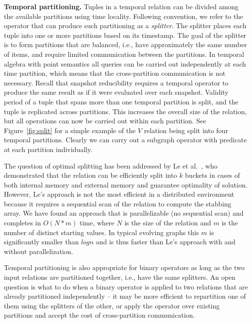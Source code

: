 {\bf Temporal partitioning.}  Tuples in a temporal relation can be
divided among the available partitions using time locality.  Following
convention, we refer to the operator that can produce such
partitioning as a {\em splitter}.  The splitter places each tuple into
one or more partitions based on its timestamp.  The goal of the
splitter is to form partitions that are balanced, i.e., have
approximately the same number of items, and require limited
communication between the partitions.  In temporal algebra with point
semantics all queries can be carried out independently at each time
partition, which means that the cross-partition communication is not
necessary.  Recall that snapshot reducibility requires a temporal
operator to produce the same result as if it were evaluated over each
snapshot.  Validity period of a tuple that spans more than one
temporal partition is split, and the tuple is replicated across
partitions.  This increases the overall size of the relation, but all
operations can now be carried out within each partition.  See
Figure~\ref{fig:split} for a simple example of the $V$ relation being
split into four temporal partitions.  Clearly we can carry out a
subgraph operator with predicate  at each
partition individually.

The question of optimal splitting has been addressed by Le et
al.~\cite{Le2013}, who demonstrated that the relation can be
efficiently split into $k$ buckets in cases of both internal memory
and external memory and guarantee optimality of solution.  However, Le's approach is not the most efficient in a
distributed environment because it requires a sequential scan of the
relation to compute the stabbing array.  We have found an approach
that is parallelizable (no sequential scan) and completes in $O(N*m)$
time, where $N$ is the size of the relation and $m$ is the number of
distinct starting values.  In typical evolving graphs this $m$ is
significantly smaller than $log n$ and is thus faster than Le's
approach with and without parallelization.


Temporal partitioning is also appropriate for binary operators as long
as the two input relations are partitioned together, i.e., have the
same splitters.    An open question is what to do when a binary
operator is applied to two relations that are already partitioned
independently -- it may be more efficient to repartition one of them
using the splitters of the other, or apply the operator over existing
partitions and accept the cost of cross-partition communication.

